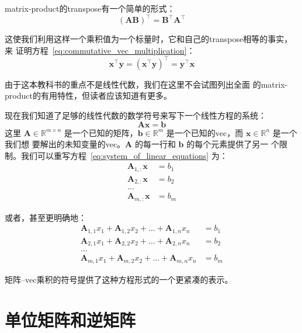 \gls*{matrix-product}的\gls*{transpose}有一个简单的形式：
\begin{equation}
  (\pmb{A}\pmb{B})^{\top} = \pmb{B}^{\top}\pmb{A}^{\top}
  \label{eq:transpose_of_matrix_product}
\end{equation}

这使我们利用这样一个乘积值为一个标量时，它和自己的\gls*{transpose}相等的事实，来
证明方程~\ref{eq:commutative_vec_multiplication}：
\begin{equation}
  \pmb{x}^{\top}\pmb{y} = (\pmb{x}^{\top}\pmb{y})^{\top} = \pmb{y}^{\top}\pmb{x}
  \label{eq:demonstrate_commutative_vec_multiplication}
\end{equation}

由于这本教科书的重点不是线性代数，我们在这里不会试图列出全面
的\gls*{matrix-product}的有用特性，但读者应该知道有更多。

现在我们知道了足够的线性代数的数学符号来写下一个线性方程的系统：
\begin{equation}
  \pmb{A}\pmb{x} = \pmb{b}
  \label{eq:system_of_linear_equations}
\end{equation}
这里 $\pmb{A} \in \mathbb{R}^{m \times n}$ 是一个已知的矩阵，$\pmb{b} \in
\mathbb{R}^m$ 是一个已知的\gls*{vec}，而 $\pmb{x} \in \mathbb{R}^n$ 是一个我们想
要解出的未知变量的\gls*{vec}。$\pmb{A}$ 的每一行和 $\pmb{b}$ 的每个元素提供了另一
个限制。我们可以重写方程~\ref{eq:system_of_linear_equations} 为：
\begin{align}
  \pmb{A}_{1,:}\pmb{x} &= b_1\\
  \pmb{A}_{2,:}\pmb{x} &= b_2\\
  \ldots \\
  \pmb{A}_{m,:}\pmb{x} &= b_m
\end{align}

或者，甚至更明确地：
\begin{align}
  \pmb{A}_{1,1}x_1 + \pmb{A}_{1,2}x_2 + \ldots + \pmb{A}_{1,n}x_n &= b_1 \\
  \pmb{A}_{2,1}x_1 + \pmb{A}_{2,2}x_2 + \ldots + \pmb{A}_{2,n}x_n &= b_2 \\
  \ldots\hspace{5em} \\
  \pmb{A}_{m,1}x_1 + \pmb{A}_{m,2}x_2 + \ldots + \pmb{A}_{m,n}x_n &= b_m
\end{align}

矩阵--\gls*{vec}乘积的符号提供了这种方程形式的一个更紧凑的表示。

\section{单位矩阵和逆矩阵}
\label{sec:identity_and_inverse_matrices}

